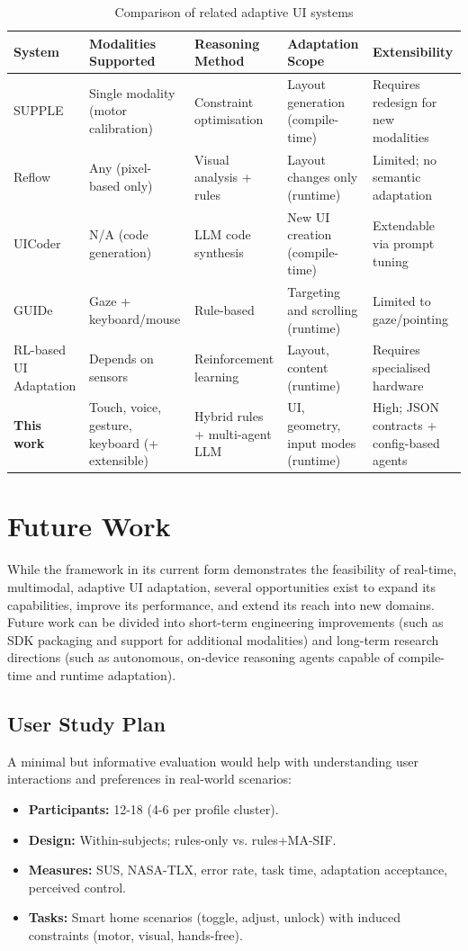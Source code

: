 \documentclass[openany]{book}
\begin{document}
\begin{table}[h]
\centering
\small
\caption{Comparison of related adaptive UI systems}
\label{tab:related-comparison}
\begin{tabular}{p{2cm}p{3cm}p{3cm}p{3cm}p{3cm}}
\toprule
\textbf{System} & \textbf{Modalities Supported} & \textbf{Reasoning Method} & \textbf{Adaptation Scope} & \textbf{Extensibility} \\
\midrule
SUPPLE & Single modality (motor calibration) & Constraint optimisation & Layout generation (compile-time) & Requires redesign for new modalities \\
Reflow & Any (pixel-based only) & Visual analysis + rules & Layout changes only (runtime) & Limited; no semantic adaptation \\
UICoder & N/A (code generation) & LLM code synthesis & New UI creation (compile-time) & Extendable via prompt tuning \\
GUIDe & Gaze + keyboard/mouse & Rule-based & Targeting and scrolling (runtime) & Limited to gaze/pointing \\
RL-based UI Adaptation & Depends on sensors & Reinforcement learning & Layout, content (runtime) & Requires specialised hardware \\
\textbf{This work} & Touch, voice, gesture, keyboard (+ extensible) & Hybrid rules + multi-agent LLM & UI, geometry, input modes (runtime) & High; JSON contracts + config-based agents \\
\bottomrule
\end{tabular}
\end{table}

\section{Future Work} 
While the framework in its current form demonstrates the feasibility of real-time, multimodal, adaptive UI adaptation, several opportunities exist to expand its capabilities, improve its performance, and extend its reach into new domains. Future work can be divided into short-term engineering improvements (such as SDK packaging and support for additional modalities) and long-term research directions (such as autonomous, on-device reasoning agents capable of compile-time and runtime adaptation).

\subsection{User Study Plan}
A minimal but informative evaluation would help with understanding user interactions and preferences in real-world scenarios:
\begin{itemize}
    \item \textbf{Participants:} 12-18 (4-6 per profile cluster).
    \item \textbf{Design:} Within-subjects; rules-only vs. rules+MA-SIF.
    \item \textbf{Measures:} SUS, NASA-TLX, error rate, task time, adaptation acceptance, perceived control.
    \item \textbf{Tasks:} Smart home scenarios (toggle, adjust, unlock) with induced constraints (motor, visual, hands-free).
\end{itemize}
\end{document}
